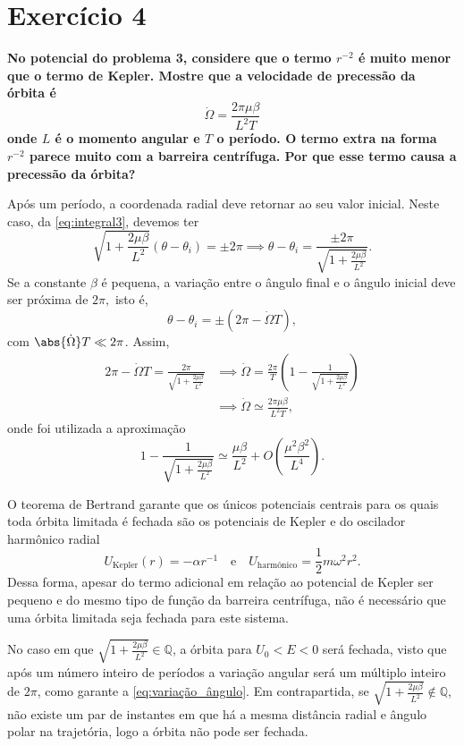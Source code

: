 \section*{Exercício 4}
\textbf{No potencial do problema 3, considere que o termo \(r^{-2}\) é muito menor que o termo de Kepler. Mostre que a velocidade de precessão da órbita é}
\begin{equation*}
    \dot\Omega = \frac{2\pi\mu\beta}{L^2T}
\end{equation*}
\textbf{onde \(L\) é o momento angular e \(T\) o período. O termo extra na forma \(r^{-2}\) parece muito com a barreira centrífuga. Por que esse termo causa a precessão da órbita?}

Após um período, a coordenada radial deve retornar ao seu valor inicial. Neste caso, da \cref{eq:integral3}, devemos ter
\begin{equation}
    \sqrt{1 + \frac{2\mu\beta}{L^2}}\left(\theta - \theta_i\right) = \pm2\pi \implies \theta - \theta_i = \frac{\pm 2\pi}{\sqrt{1 + \frac{2\mu\beta}{L^2}}}.\label{eq:variação_ângulo}
\end{equation}
Se a constante \(\beta\) é pequena, a variação entre o ângulo final e o ângulo inicial deve ser próxima de \(2\pi,\) isto é,
\begin{equation}
    \theta - \theta_i = \pm(2\pi - \dot\Omega T),
\end{equation}
com \(\abs{\dot\Omega} T \ll 2\pi\). Assim,
\begin{align}
    2\pi - \dot\Omega T = \frac{2\pi}{\sqrt{1 + \frac{2\mu\beta}{L^2}}} &\implies \dot\Omega = \frac{2\pi}{T}\left(1 - \frac{1}{\sqrt{1 + \frac{2\mu\beta}{L^2}}}\right)\\
                                                                        &\implies \dot\Omega \simeq \frac{2\pi\mu\beta}{L^2T},
\end{align}
onde foi utilizada a aproximação
\begin{equation}
    1 - \frac{1}{\sqrt{1 + \frac{2\mu\beta}{L^2}}} \simeq \frac{\mu\beta}{L^2} + O\left(\frac{\mu^2\beta^2}{L^4}\right).
\end{equation}

O teorema de Bertrand garante que os únicos potenciais centrais para os quais toda órbita limitada é fechada são os potenciais de Kepler e do oscilador harmônico radial
\begin{equation}
    U_{\mathrm{Kepler}}(r) = -\alpha r^{-1}\quad\text{e}\quad U_{\text{harmônico}} = \frac12m\omega^2r^2.
\end{equation}
Dessa forma, apesar do termo adicional em relação ao potencial de Kepler ser pequeno e do mesmo tipo de função da barreira centrífuga, não é necessário que uma órbita limitada seja fechada para este sistema.

No caso em que \(\sqrt{1 + \frac{2\mu\beta}{L^2}} \in \mathbb{Q}\), a órbita para \(U_0 < E < 0\) será fechada, visto que após um número inteiro de períodos a variação angular será um múltiplo inteiro de \(2\pi\), como garante a \cref{eq:variação_ângulo}. Em contrapartida, se \(\sqrt{1 + \frac{2\mu\beta}{L^2}}\notin \mathbb{Q}\), não existe um par de instantes em que há a mesma distância radial e ângulo polar na trajetória, logo a órbita não pode ser fechada.
